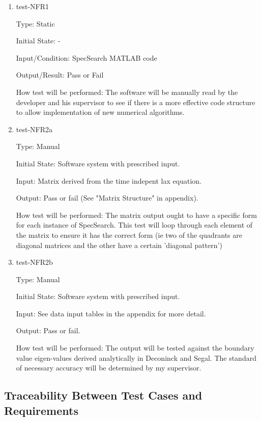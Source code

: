 \documentclass[12pt, titlepage]{article}
\begin{document}
\begin{enumerate}

\item{test-NFR1\\}

Type: Static
					
Initial State: -
					
Input/Condition: SpecSearch MATLAB code
					
Output/Result: Pass or Fail
					
How test will be performed: The software will be manually read by the developer 
and his supervisor to see if there is a more effective code structure to allow 
implementation of 
new numerical algorithms. 

\item{test-NFR2a\\} 

Type: Manual 

Initial State: Software system with prescribed input.

Input: Matrix derived from the time indepent lax equation.

Output: Pass or fail (See "Matrix Structure" in appendix).

How test will be performed: The matrix output ought to have a specific form for 
each instance of SpecSearch. This test will loop through each element of the 
matrix to ensure it has the correct form (ie two of the quadrants are diagonal 
matrices and the other have a certain 'diagonal pattern') 

\item{test-NFR2b\\} 

Type: Manual 

Initial State: Software system with prescribed input.

Input: See data input tables in the appendix for more detail.

Output: Pass or fail.

How test will be performed: The output will be tested against the boundary 
value eigen-values derived analytically in Deconinck and Segal. The standard of 
necessary accuracy will be determined by my supervisor. \\ 

\end{enumerate}

\newpage
\subsection{Traceability Between Test Cases and Requirements}
\end{document}
